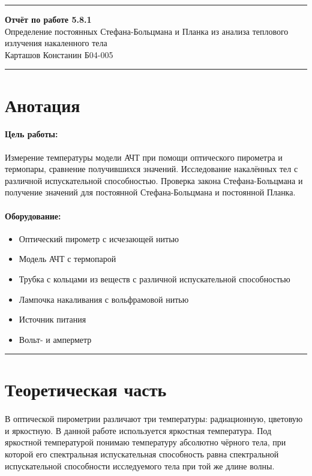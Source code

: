 \documentclass[a4paper,12pt]{article} %
\begin{document}


\hrule 	
\medskip
\begin{raggedright}
{\large \textbf{Отчёт по работе 5.8.1}}
\\
\medskip
{\Large Определение постоянных Стефана-Больцмана и Планка из анализа теплового излучения накаленного тела} 
\\
\medskip
{\large Карташов Констанин Б04-005}
\medskip
\hrule
\medskip
\end{raggedright}


\section{Анотация}

\paragraph{Цель работы:} 
Измерение температуры модели АЧТ при помощи оптического пирометра и термопары, сравнение получившихся значений. Исследование накалённых тел с различной испускательной способностью. Проверка закона Стефана-Больцмана и получение значений для постоянной Стефана-Больцмана и постоянной Планка.

\paragraph{Оборудование:}
\begin{itemize}
\renewcommand{\labelitemi}{$\triangleright$}
\itemsep0em
\item Оптический пирометр с исчезающей нитью
\item Модель АЧТ с термопарой
\item Трубка с кольцами из веществ с различной испускательной способностью
\item Лампочка накаливания с вольфрамовой нитью
\item Источник питания
\item Вольт- и амперметр
\end{itemize}


\medskip\hrule\medskip

\section{Теоретическая часть}

\paragraph{} В оптической пирометрии различают три температуры: радиационную, цветовую и яркостную. В данной работе используется яркостная температура. Под яркостной температурой понимаю температуру абсолютно чёрного тела, при которой его спектральная испускательная способность равна спектральной испускательной способности исследуемого тела при той же длине волны. 
\end{document}
